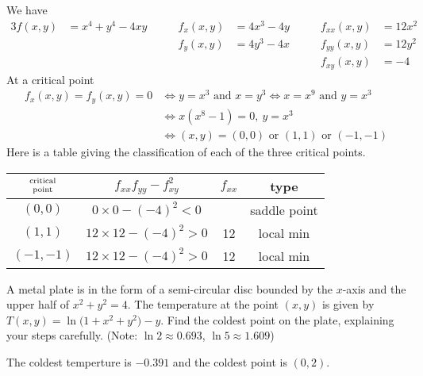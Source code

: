 \begin{solution}
We have
\begin{alignat*}{3}
f(x,y)&=x^4+y^4-4xy\qquad &
f_x(x,y)&=4x^3-4y\qquad &
f_{xx}(x,y)&=12x^2\\
 & & f_y(x,y)&=4y^3-4x &
f_{yy}(x,y)&=12y^2 \\
 & & & &f_{xy}(x,y)&=-4
\end{alignat*}
At a critical point
\begin{align*}
f_x(x,y)=f_y(x,y)=0
&\iff y=x^3\text{ and }x=y^3
\iff x=x^9\text{ and }y=x^3 \\
&\iff x(x^8-1)=0,\ y=x^3\\
&\iff (x,y)=(0,0)\text{ or }(1,1)\text{ or }(-1,-1)
\end{align*}
Here is a table giving the classification of each of the three critical
points.
\begin{center}
\renewcommand{\arraystretch}{1.3}
     \begin{tabular}{|c|c|c|c|}
     \hline
    $\Atop{\text{critical}}{\text{point}}$  & $f_{xx}f_{yy}-f_{xy}^2$ & 
                                                          $f_{xx}$ & type \\    
    \hline
     $(0,0)$   & $0\times 0-(-4)^2<0$   &    &saddle point \\ \hline
     $(1,1)$   & $12\times 12-(-4)^2>0$ & 12 & local min \\  \hline
     $(-1,-1)$ & $12\times 12-(-4)^2>0$ & 12 & local min \\  \hline
     \end{tabular}
\renewcommand{\arraystretch}{1.0}
\end{center}
\end{solution}

\begin{question}[M200 2002A] %
A metal plate is in the form of a semi-circular disc bounded
by the $x$-axis and the upper half of $x^2+y^2=4$. The temperature at
the point $(x,y)$ is given by $T(x,y)=\ln\big(1+x^2+y^2\big)-y$. Find the
coldest point on the plate, explaining your steps carefully. (Note: 
$\ln 2\approx 0.693$, $\ln 5\approx 1.609$)
\end{question}


\begin{answer}
The coldest temperture is $-0.391$ and the coldest point is $(0,2)$.
\end{answer}

